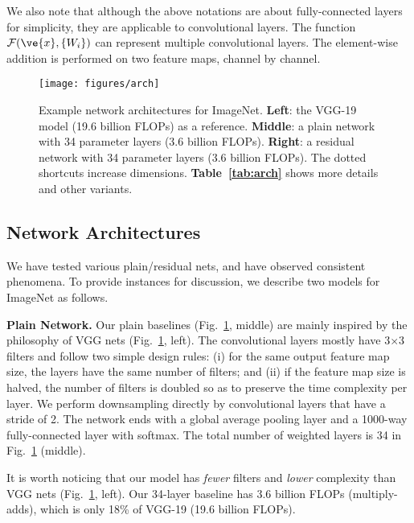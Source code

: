 We also note that although the above notations are about fully-connected layers for simplicity, they are applicable to convolutional layers. The function $\mathcal{F}(\ve{x}, \{W_{i}\})$ can represent multiple convolutional layers. The element-wise addition is performed on two feature maps, channel by channel.

\begin{figure}[t]
\begin{center}
\vspace{.5em}
\texttt{[image: figures/arch]}
\end{center}
\caption{Example network architectures for ImageNet. \textbf{Left}: the VGG-19 model \cite{Simonyan2015} (19.6 billion FLOPs) as a reference. \textbf{Middle}: a plain network with 34 parameter layers (3.6 billion FLOPs). \textbf{Right}: a residual network with 34 parameter layers (3.6 billion FLOPs). The dotted shortcuts increase dimensions. \textbf{Table~\ref{tab:arch}} shows more details and other variants.}
\label{fig:arch}
\vspace{-1em}
\end{figure}

\subsection{Network Architectures}

We have tested various plain/residual nets, and have observed consistent phenomena. To provide instances for discussion, we describe two models for ImageNet as follows.

\vspace{6pt}
\noindent\textbf{Plain Network.}
Our plain baselines (Fig.~\ref{fig:arch}, middle) are mainly inspired by the philosophy of VGG nets \cite{Simonyan2015} (Fig.~\ref{fig:arch}, left).
The convolutional layers mostly have 3$\times$3 filters and follow two simple design rules: (i) for the same output feature map size, the layers have the same number of filters; and (ii) if the feature map size is halved, the number of filters is doubled so as to preserve the time complexity per layer. We perform downsampling directly by convolutional layers that have a stride of 2.
The network ends with a global average pooling layer and a 1000-way fully-connected layer with softmax. The total number of weighted layers is 34 in Fig.~\ref{fig:arch} (middle).

It is worth noticing that our model has \emph{fewer} filters and \emph{lower} complexity than VGG nets \cite{Simonyan2015} (Fig.~\ref{fig:arch}, left). Our 34-layer baseline has 3.6 billion FLOPs (multiply-adds), which is only 18\% of VGG-19 (19.6 billion FLOPs).

